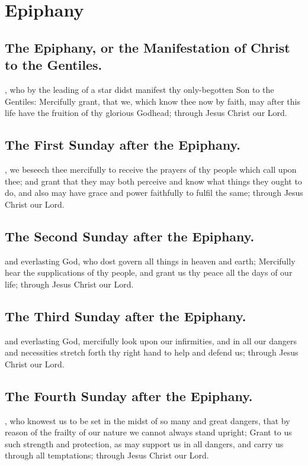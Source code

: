 \section{Epiphany}

\subsection{The Epiphany, or the Manifestation of Christ to the Gentiles.}
, who by the leading of a star didst manifest thy only-begotten Son to the Gentiles: Mercifully grant, that we, which know thee now by faith, may after this life have the fruition of thy glorious Godhead; through Jesus Christ our Lord.

\subsection{The First Sunday after the Epiphany.}
, we beseech thee mercifully to receive the prayers of thy people which call upon thee; and grant that they may both perceive and know what things they ought to do, and also may have grace and power faithfully to fulfil the same; through Jesus Christ our Lord.

\subsection{The Second Sunday after the Epiphany.}
 and everlasting God, who dost govern all things in heaven and earth; Mercifully hear the supplications of thy people, and grant us thy peace all the days of our life; through Jesus Christ our Lord.

\subsection{The Third Sunday after the Epiphany.}
 and everlasting God, mercifully look upon our infirmities, and in all our dangers and necessities stretch forth thy right hand to help and defend us; through Jesus Christ our Lord.

\subsection{The Fourth Sunday after the Epiphany.}
, who knowest us to be set in the midst of so many and great dangers, that by reason of the frailty of our nature we cannot always stand upright; Grant to us such strength and protection, as may support us in all dangers, and carry us through all temptations; through Jesus Christ our Lord.

